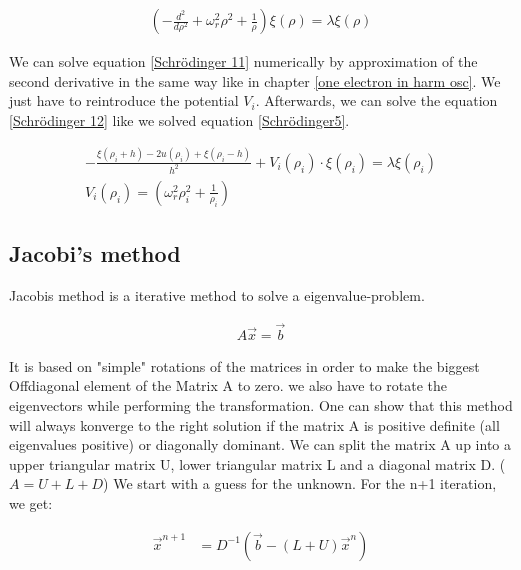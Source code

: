\documentclass[10pt,a4paper]{article}
\begin{document}
\begin{align}
\left(-\frac{d^2}{d \rho^2}+ \omega_r^2 \rho^2 + \frac{1}{\rho} \right) \xi(\rho) = \lambda \xi(\rho) \label{Schrödinger 11}
\end{align}

We can solve equation \ref{Schrödinger 11} numerically by approximation of the second derivative in the same way like in chapter \ref{one electron in harm osc}. We just have to reintroduce the potential $V_i$. Afterwards, we can solve the equation \ref{Schrödinger 12} like we solved equation \ref{Schrödinger5}. 

\begin{align}
-\frac{\xi(\rho_i+h)-2u(\rho_i)+\xi(\rho_i-h)}{h^2}+V_i(\rho_i) \cdot \xi(\rho_i) = \lambda \xi(\rho_i) \label{Schrödinger 12}\\
V_i(\rho_i) = \left( \omega_r^2 \rho_i^2 + \frac{1}{\rho_i} \right)
\end{align}


\subsection{Jacobi's method \label{Jacobis method}}

Jacobis method is a iterative method to solve a eigenvalue-problem. 

\begin{align}
A \vec{x} = \vec{b}
\end{align}

It is based on "simple" rotations of the matrices in order to make the biggest Offdiagonal element of the Matrix A to zero. we also have to rotate the eigenvectors while performing the transformation. One can show that this method will always konverge to the right solution if the matrix A is positive definite (all eigenvalues positive) or diagonally dominant. We can split the matrix A up into a upper triangular matrix U, lower triangular matrix L and a diagonal matrix D. ($ A=U + L + D$)
We start with a guess for the unknown. For the n+1 iteration, we get:

\begin{align}
\vec{x}^{n+1} &= D^{-1} \left( \vec{b}- (L+U) \vec{x}^{n} \right) 
\end{align}
\end{document}
